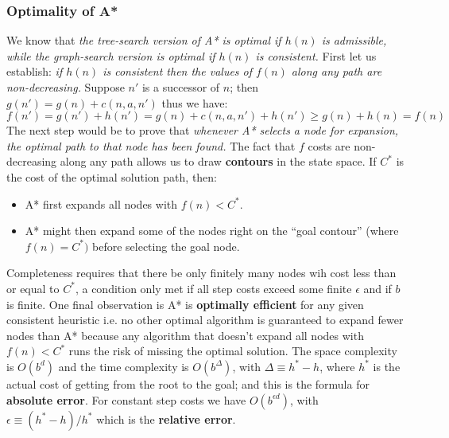 \documentclass[twoside]{article}
\begin{document}
\subsubsection{Optimality of A*}
We know that \emph{the tree-search version of A* is optimal if \(h(n)\) is 
admissible, while the graph-search version is optimal if \(h(n)\) is consistent.}
First let us establish: \emph{if \(h(n)\) is consistent then the values of
\(f(n)\) along any path are non-decreasing.} Suppose \(n'\) is a successor of
\(n\); then \(g(n') = g(n) + c(n,a,n')\) thus we have:
\begin{equation}
        f(n') = g(n') + h(n') = g(n) + c(n,a,n') + h(n') \geq g(n) + h(n) = f(n)
\end{equation}
The next step would be to prove that \emph{whenever A* selects a node for expansion,
the optimal path to that node has been found.} The fact that \(f\) costs are
non-decreasing along any path allows us to draw \textbf{contours} in the state
space. If \(C^*\) is the cost of the optimal solution path, then:
\begin{itemize}
        \item A* first expands all nodes with \(f(n) < C^*\).
        \item A* might then expand some of the nodes right on the ``goal contour''
              (where \(f(n) = C^*)\) before selecting the goal node.
\end{itemize}
Completeness requires that there be only finitely many nodes wih cost less than
or equal to \(C^*\), a condition only met if all step costs exceed some finite
\(\epsilon\) and if \(b\) is finite. One final observation is A* is 
\textbf{optimally efficient} for any given consistent heuristic i.e. no other
optimal algorithm is guaranteed to expand fewer nodes than A* because any 
algorithm that doesn't expand all nodes with \(f(n) < C^*\) runs the risk of 
missing the optimal solution. The space complexity is \(O(b^d)\) and the 
time complexity is \(O(b^\Delta)\), with 
\(\Delta \equiv h^* - h\), where \(h^*\) is the actual cost of getting from 
the root to the goal; and this is the formula for \textbf{absolute error}.
For constant step costs we have \(O(b^{\epsilon d})\), with 
\(\epsilon \equiv (h^* - h)/h^*\) which is the \textbf{relative error}.
\end{document}
